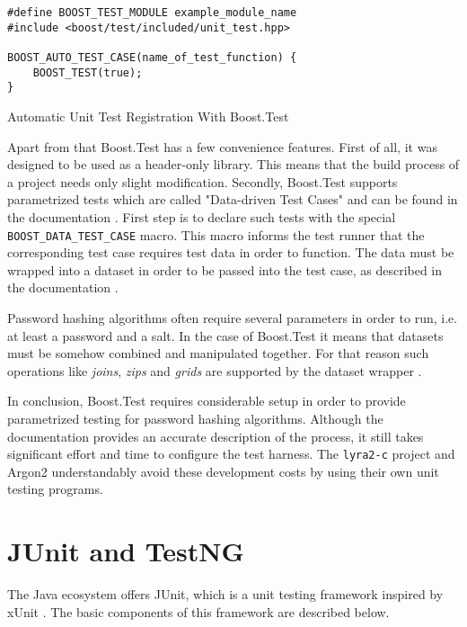 \begin{listing}
\centering
\begin{verbatim}
#define BOOST_TEST_MODULE example_module_name
#include <boost/test/included/unit_test.hpp>

BOOST_AUTO_TEST_CASE(name_of_test_function) {
    BOOST_TEST(true);
}
  \end{verbatim}
  \caption{Automatic Unit Test Registration With Boost.Test}
  \label{fig:boost-auto-test-case}
\end{listing}

Apart from that Boost.Test has a few convenience features. First of all, it was designed to be used as a header-only library. This means that the build process of a project needs only slight modification. Secondly, Boost.Test supports parametrized tests which are called "Data-driven Test Cases" and can be found in the documentation \cite{boost:2017:test-data-driven}. First step is to declare such tests with the special \texttt{BOOST\_DATA\_TEST\_CASE} macro. This macro informs the test runner that the corresponding test case requires test data in order to function. The data must be wrapped into a dataset in order to be passed into the test case, as described in the documentation \cite{boost:2017:test-docs-dataset}.

Password hashing algorithms often require several parameters in order to run, i.e. at least a password and a salt. In the case of Boost.Test it means that datasets must be somehow combined and manipulated together. For that reason such operations like \emph{joins}, \emph{zips} and \emph{grids} are supported by the dataset wrapper \cite{boost:2017:test-docs-dataset-operations}.

In conclusion, Boost.Test requires considerable setup in order to provide parametrized testing for password hashing algorithms. Although the documentation provides an accurate description of the process, it still takes significant effort and time to configure the test harness. The \texttt{lyra2-c} project and Argon2 understandably avoid these development costs by using their own unit testing programs.

\section{JUnit and TestNG}
\label{sec:unit-junit-testng}

The Java ecosystem offers JUnit, which is a unit testing framework inspired by xUnit \cite{junit:2017:homepage}. The basic components of this framework are described below.

